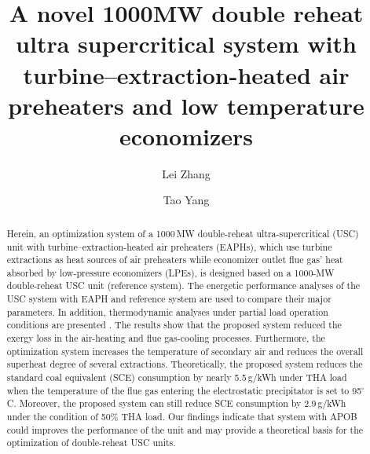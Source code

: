 \documentclass[preprint,12pt]{elsarticle}
\begin{document}
\begin{frontmatter}



\title{A novel 1000MW double reheat ultra supercritical system with turbine–extraction-heated air preheaters and low temperature economizers}


\author[rvt]{Lei Zhang}
\author[focal]{Tao Yang}

\address[rvt]{River Valley Technologies, SJP Building,Cotton Hills, Trivandrum, Kerala, India 695014}
\address[focal]{River Valley Technologies, 9, Browns Court,Kennford, Exeter, United Kingdom}

\begin{abstract}
Herein, an optimization system of a 1000\,MW double-reheat ultra-supercritical (USC) unit with turbine–extraction-heated air preheaters (EAPHs), which use turbine extractions as heat sources of air preheaters while economizer outlet flue gas’ heat absorbed by low-pressure economizers (LPEs), is designed based on a 1000-MW double-reheat USC unit (reference system). The energetic performance analyses of the USC system with EAPH and reference system are used to compare their major parameters. In addition, thermodynamic analyses under partial load operation conditions are presented . The results show that the proposed system reduced the exergy loss in the air-heating and flue gas-cooling processes. Furthermore, the optimization system increases the temperature of secondary air and reduces the overall superheat degree of several extractions. Theoretically, the proposed system reduces the standard coal equivalent (SCE) consumption by nearly 5.5\,g/kWh under THA load when the temperature of the flue gas entering the electrostatic precipitator is set to 95$^\circ$C. Moreover, the proposed system can still reduce SCE consumption by 2.9\,g/kWh under the condition of 50\% THA load. Our findings indicate that system with APOB could improves the performance of the unit and may provide a theoretical basis for the optimization of double-reheat USC units.
\end{abstract}


\end{frontmatter}
\end{document}
